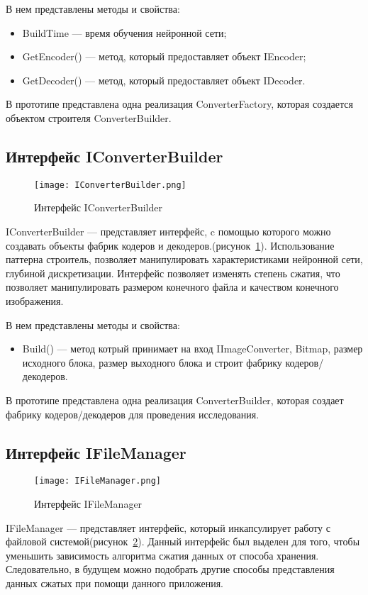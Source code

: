 В нем представлены методы и свойства:
\begin{itemize}
  \item BuildTime --- время обучения нейронной сети;
  \item GetEncoder() --- метод, который предоставляет объект IEncoder;
  \item GetDecoder() --- метод, который предоставляет объект IDecoder.
\end{itemize}

В прототипе представлена одна реализация ConverterFactory, которая создается объектом строителя ConverterBuilder.

\subsection{Интерфейс IConverterBuilder}
\label{subsub:development:iconverterbuilder}

\begin{figure}[ht]
\centering
  \texttt{[image: IConverterBuilder.png]}
  \caption{ Интерфейс IConverterBuilder }
  \label{fig:iconverterbuilder}
\end{figure}
IConverterBuilder --- представляет интерфейс, c помощью которого можно создавать объекты фабрик кодеров и декодеров.(рисунок~\ref{fig:iconverterbuilder}).
Использование паттерна строитель, позволяет манипулировать характеристиками нейронной сети, глубиной дискретизации.
Интерфейс позволяет изменять степень сжатия, что позволяет манипулировать размером конечного файла и качеством конечного изображения.

В нем представлены методы и свойства:
\begin{itemize}
  \item Build() --- метод котрый принимает на вход IImageConverter, Bitmap, размер исходного блока,
  размер выходного блока и строит фабрику кодеров/декодеров.
\end{itemize}

В прототипе представлена одна реализация ConverterBuilder, которая создает фабрику кодеров/декодеров для проведения исследования.

\subsection{Интерфейс IFileManager}
\label{sub:development:ifilemanager}

\begin{figure}[ht]
\centering
  \texttt{[image: IFileManager.png]}
  \caption{ Интерфейс IFileManager }
  \label{fig:ifilemanager}
\end{figure}
IFileManager --- представляет интерфейс, который инкапсулирует работу с файловой системой(рисунок~\ref{fig:ifilemanager}).
Данный интерфейс был выделен для того, чтобы уменьшить зависимость алгоритма сжатия данных от способа хранения.
Следовательно, в будущем можно подобрать другие способы представления данных сжатых при помощи данного приложения.

